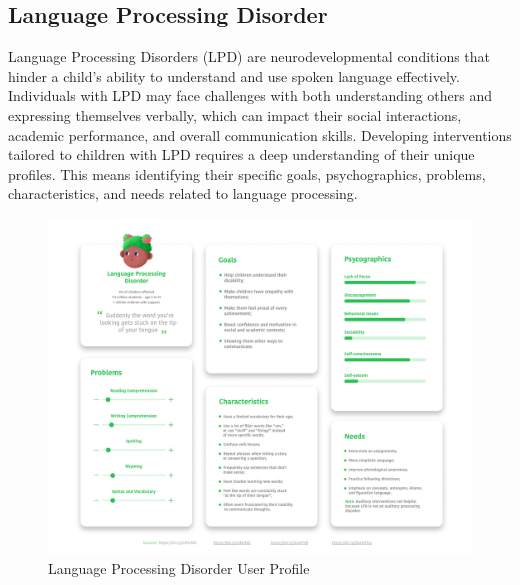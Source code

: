 \subsection{Language Processing Disorder}
Language Processing Disorders (LPD) are neurodevelopmental conditions that hinder a child’s ability to understand and use spoken language effectively. Individuals with LPD may face challenges with both understanding others and expressing themselves verbally, which can impact their social interactions, academic performance, and overall communication skills. Developing interventions tailored to children with LPD requires a deep understanding of their unique profiles. This means identifying their specific goals, psychographics, problems, characteristics, and needs related to language processing.

\begin{figure}[H]
    \centering
    \includegraphics[width=0.8\linewidth]{Chapters/figma/Language Processing Disorder.png}
    \caption{Language Processing Disorder User Profile}
    \label{fig:lpdUserProfile}
\end{figure}

